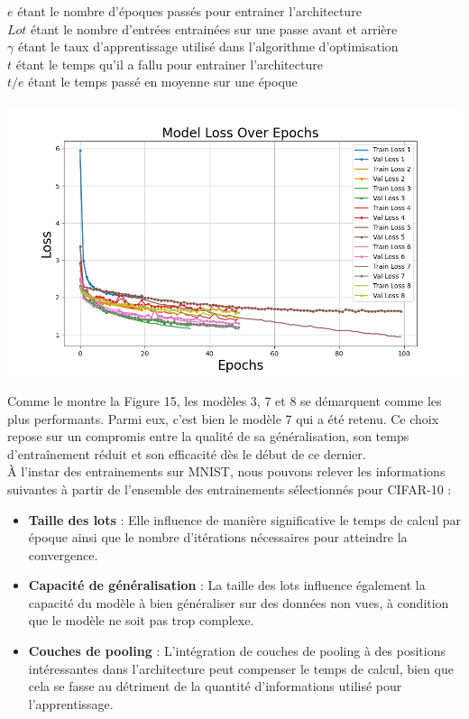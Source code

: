 \begin{multicols}{2}
{$e$ étant le nombre d'époques passés pour entrainer l'architecture \\

$Lot$ étant le nombre d'entrées entrainées sur une passe avant et arrière \\

$\gamma$ étant le taux d'apprentissage utilisé dans l'algorithme d'optimisation \\

$t$ étant le temps qu'il a fallu pour entrainer l'architecture \\

$t/e$ étant le temps passé en moyenne sur une époque \\
} \\

\includegraphics[width=\columnwidth]{images/cifar_10_losses.png}
\hfill\break

Comme le montre la Figure 15, les modèles 3, 7 et 8 se démarquent comme 
les plus performants. Parmi eux, c'est bien le modèle 7 qui a été retenu. Ce choix repose sur un 
compromis entre la qualité de sa généralisation, son temps d’entraînement réduit et 
son efficacité dès le début de ce dernier. \\

À l'instar des entrainements sur MNIST, nous pouvons relever les informations suivantes à partir de l'ensemble des entrainements sélectionnés pour CIFAR-10 :  
\begin{itemize}
    \item \textbf{Taille des lots} : Elle influence de manière significative le temps de calcul par époque ainsi que le nombre d’itérations nécessaires pour atteindre 
    la convergence.
    \item \textbf{Capacité de généralisation} : La taille des lots influence également la capacité du modèle à bien généraliser sur des données non vues, à condition que le modèle ne soit pas trop complexe.
    \item \textbf{Couches de pooling} : L’intégration de couches de pooling à des positions intéressantes dans l’architecture peut compenser le temps de calcul, 
    bien que cela se fasse au détriment de la quantité d’informations utilisé pour l’apprentissage.
\end{itemize}
\hfill\break



\end{multicols}
